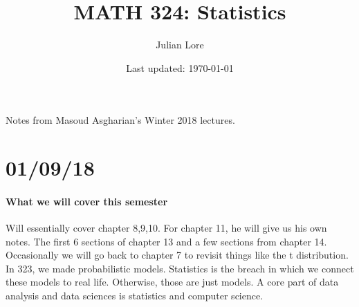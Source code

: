 \documentclass[12 pt]{article}
\author{Julian Lore}
\date{Last updated: \today}
\title{MATH 324: Statistics}
\begin{document}
	\onehalfspacing
	\maketitle
	Notes from Masoud Asgharian's Winter 2018 lectures.
	\tableofcontents
    \section{01/09/18}
        \paragraph{What we will cover this semester}
        Will essentially cover chapter 8,9,10. For chapter 11, he will
        give us his own notes. The first 6 sections of chapter 13 and
        a few sections from chapter 14. Occasionally we will go back
        to chapter 7 to revisit things like the t distribution.
        \\ In 323, we made probabilistic models. Statistics is the
        breach in which we connect these models to real
        life. Otherwise, those are just models. A core part of data
        analysis and data sciences is statistics and computer
        science.
\end{document}
